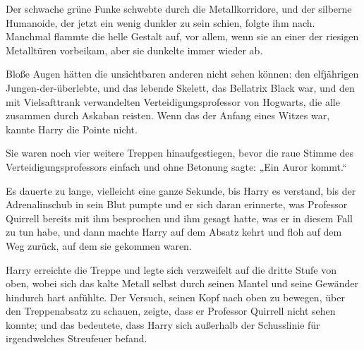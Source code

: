 \later

Der schwache grüne Funke schwebte durch die Metallkorridore, und der silberne Humanoide, der jetzt ein wenig dunkler zu sein schien, folgte ihm nach. Manchmal flammte die helle Gestalt auf, vor allem, wenn sie an einer der riesigen Metalltüren vorbeikam, aber sie dunkelte immer wieder ab.

Bloße Augen hätten die unsichtbaren anderen nicht sehen können: den elfjährigen Jungen-der-überlebte, und das lebende Skelett, das Bellatrix Black war, und den mit Vielsafttrank verwandelten Verteidigungsprofessor von Hogwarts, die alle zusammen durch Askaban reisten. Wenn das der Anfang eines Witzes war, kannte Harry die Pointe nicht.

Sie waren noch vier weitere Treppen hinaufgestiegen, bevor die raue Stimme des Verteidigungsprofessors einfach und ohne Betonung sagte: „Ein Auror kommt.“

Es dauerte zu lange, vielleicht eine ganze Sekunde, bis Harry es verstand, bis der Adrenalinschub in sein Blut pumpte und er sich daran erinnerte, was Professor Quirrell bereits mit ihm besprochen und ihm gesagt hatte, was er in diesem Fall zu tun habe, und dann machte Harry auf dem Absatz kehrt und floh auf dem Weg zurück, auf dem sie gekommen waren.

Harry erreichte die Treppe und legte sich verzweifelt auf die dritte Stufe von oben, wobei sich das kalte Metall selbst durch seinen Mantel und seine Gewänder hindurch hart anfühlte. Der Versuch, seinen Kopf nach oben zu bewegen, über den Treppenabsatz zu schauen, zeigte, dass er Professor Quirrell nicht sehen konnte; und das bedeutete, dass Harry sich außerhalb der Schusslinie für irgendwelches Streufeuer befand.

